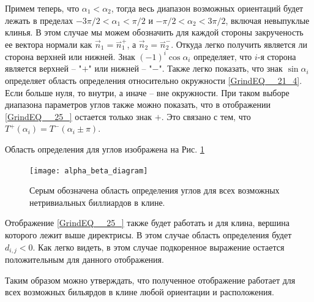 \documentclass[a4paper]{article}
\begin{document}
 Примем теперь, что $\alpha_1<\alpha_2$, тогда весь диапазон возможных ориентаций будет лежать в пределах $-3\pi/2<\alpha_1<\pi/2$ и $-\pi/2<\alpha_2<3\pi/2$, включая невыпуклые клинья. В этом случае мы можем обозначить для каждой стороны закрученость ее вектора нормали как $\vec{n}_1=\overset{\rightharpoonup }{n}_1^+$, а $\vec{n}_2=\overset{\rightharpoonup }{n}_2^-$. Откуда легко получить является ли сторона верхней или нижней. Знак $(-1)^i\cos\alpha_i$ определяет, что $i$-я сторона является верхней -- "$+$" или нижней -- "$-$". Также легко показать, что знак $\sin\alpha_i$ определяет область определения относительно окружности \eqref{GrindEQ__21_4}. Если больше нуля, то внутри, а иначе -- вне окружности.  При таком выборе диапазона параметров углов также можно показать, что в отображении \eqref{GrindEQ__25_} остается только знак $+$. Это связано с тем, что $T^+(\alpha_i)=T^-(\alpha_i\pm\pi)$.

Область определения для углов изображена на Рис. \ref{fig:alpha_beta_diagram}

\begin{figure}[ht]
  \centering
  \texttt{[image: alpha\_beta\_diagram]}\\
  \caption{Серым обозначена область определения углов для всех возможных нетривиальных биллиардов в клине.}\label{fig:alpha_beta_diagram}
\end{figure}
 
Отображение \eqref{GrindEQ__25_} также будет работать и для клина, вершина которого лежит выше директрисы. В этом случае область определения будет $d_{i,j}<0$. Как легко видеть, в этом случае подкоренное выражение остается положительным для данного отображения.
 
Таким образом можно утверждать, что полученное отображение работает для всех возможных бильярдов в клине любой ориентации и расположения.
 

\end{document}
